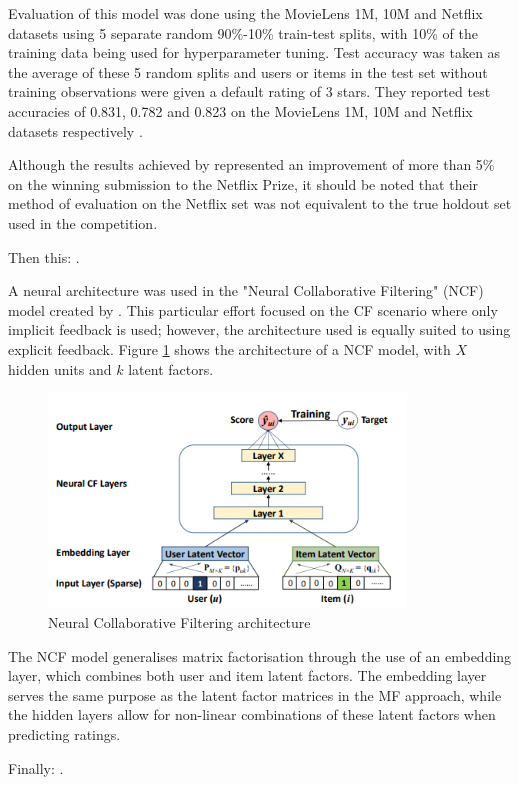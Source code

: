 Evaluation of this model was done using the MovieLens 1M, 10M and Netflix datasets using 5 separate random 90\%-10\% train-test splits, with 10\% of the training data being used for hyperparameter tuning. Test accuracy was taken as the average of these 5 random splits and users or items in the test set without training observations were given a default rating of 3 stars. They reported test accuracies of 0.831, 0.782 and 0.823 on the MovieLens 1M, 10M and Netflix datasets respectively \parencite{sedhain2015autorec}. 

Although the results achieved by \citeauthor{sedhain2015autorec} represented an improvement of more than 5\% on the winning submission to the Netflix Prize, it should be noted that their method of evaluation on the Netflix set was not equivalent to the true holdout set used in the competition.

Then this: \parencite{zheng2016neural}.

A neural architecture was used in the "Neural Collaborative Filtering" (NCF) model created by \cite{he2017neural}. This particular effort focused on the CF scenario where only implicit feedback is used; however, the architecture used is equally suited to using explicit feedback. Figure \ref{fig:ncf-arch} shows the architecture of a NCF model, with $X$ hidden units and $k$ latent factors.

\begin{figure}[H]
\centering
\includegraphics[width=9.5cm]{Figures/2_neural-cf.png}
\decoRule
\caption[Neural Collaborative Filtering]{Neural Collaborative Filtering architecture \parencite{he2017neural}}
\label{fig:ncf-arch}
\end{figure}

The NCF model generalises matrix factorisation through the use of an embedding layer, which combines both user and item latent factors. The embedding layer serves the same purpose as the latent factor matrices in the MF approach, while the hidden layers allow for non-linear combinations of these latent factors when predicting ratings.

Finally: \parencite{rendle2019difficulty}.